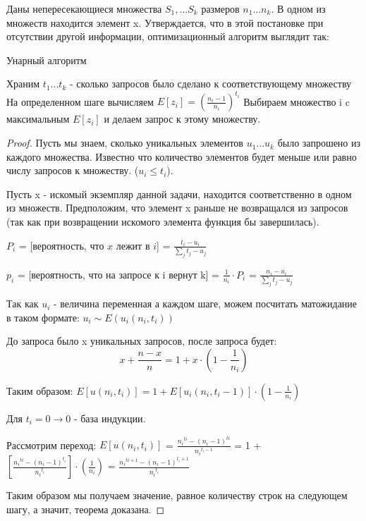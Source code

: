 \newtheorem{theorem}{Теорема}
\begin{myth}
Даны непересекающиеся множества $S_1, ... S_k$ размеров $n_1 ... n_k$.
В одном из множеств находится элемент x. Утверждается, что в этой постановке при отсутствии другой информации, оптимизационный алгоритм выглядит так: 
\begin{algorithm}[H]
\caption{Унарный алгоритм}\label{lst1}
\begin{algorithmic}
	    \State Храним $t_1 ... t_k$ - сколько запросов было сделано к соответствующему множеству
	    \State На определенном шаге вычисляем $E[z_i] = (\frac{n_i - 1}{n_i})^{t_i}$
	    \State Выбираем множество i c максимальным $E[z_i]$ и делаем запрос к этому множеству.
	    \EndFor
\end{algorithmic}
\end{algorithm}
\end{myth}
\begin{proof}
    Пусть мы знаем, сколько уникальных элементов $u_1...u_k$ было запрошено из каждого множества. Известно что количество элементов будет меньше или равно числу запросов к множеству. ($u_i \leq t_i$). 
    
    Пусть x - искомый экземпляр данной задачи, находится соответственно в одном из множеств. Предположим, что элемент x раньше не возвращался из запросов (так как при возвращении искомого элемента функция бы завершилась).
    
    
    $P_i$ = [вероятность, что $x$ лежит в $i$] = $\frac{t_i - u_i}{\sum_{j}{t_j - u_j}}$ 
    
    $p_i$ = [вероятность, что на запросе к i вернут k] = $\frac{1}{n_i} \cdot P_i$ = $\frac{n_i - u_i}{\sum_{j}{t_j - u_j}}$
    
    Так как $u_i$ - величина переменная а каждом шаге, можем посчитать матожидание в таком формате: $u_i \sim E(u_i(n_i, t_i))$
    
    До запроса было x уникальных запросов, после запроса будет: $$x + \frac{n - x}{n} = 1 + x \cdot (1 - \frac{1}{n_i})$$ 
    
    Таким образом: $E[u(n_i, t_i)] = 1 + E[u_i(n_i, t_{i} - 1)] \cdot (1 - \frac{1}{n_i})$
    
    Для $ t_i = 0 \to 0 $ - база индукции.
    
    Рассмотрим переход: 
    $E[u(n_i, t_i)]$ = $\frac{{n_i}^{ti} - {(n_i - 1)}^{ti}}{{n_i}^{t_i - 1}}$  = 1 + $[ \frac{{n_i}^{ti} - {(n_i - 1)}^{t_i}}{{n_i}^{t_i}} ] \cdot (\frac{1}{n_i})$ = $ \frac{{n_i}^{ti + 1} - {(n_i - 1)}^{t_i + 1}}{{n_i}^{t_i}} $ 
    
    Таким образом мы получаем значение, равное количеству строк на следующем шагу, а значит, теорема доказана.

\end{proof}

